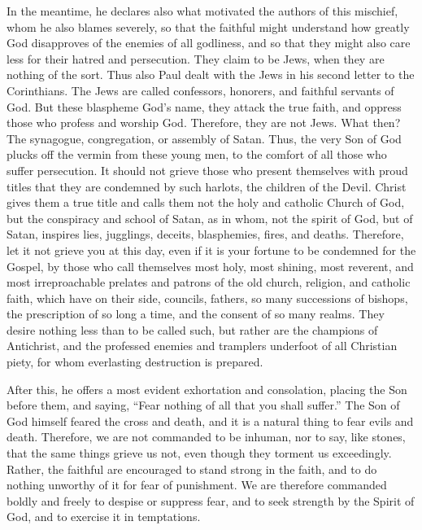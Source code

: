 In the meantime, he declares also what motivated the authors of this mischief, whom he also blames severely, so that the faithful might understand how greatly God disapproves of the enemies of all godliness, and so that they might also care less for their hatred and persecution. They claim to be Jews, when they are nothing of the sort. Thus also Paul dealt with the Jews in his second letter to the Corinthians. The Jews are called confessors, honorers, and faithful servants of God. But these blaspheme God’s name, they attack the true faith, and oppress those who profess and worship God. Therefore, they are not Jews. What then? The synagogue, congregation, or assembly of Satan. Thus, the very Son of God plucks off the vermin from these young men, to the comfort of all those who suffer persecution. It should not grieve those who present themselves with proud titles that they are condemned by such harlots, the children of the Devil. Christ gives them a true title and calls them not the holy and catholic Church of God, but the conspiracy and school of Satan, as in whom, not the spirit of God, but of Satan, inspires lies, jugglings, deceits, blasphemies, fires, and deaths. Therefore, let it not grieve you at this day, even if it is your fortune to be condemned for the Gospel, by those who call themselves most holy, most shining, most reverent, and most irreproachable prelates and patrons of the old church, religion, and catholic faith, which have on their side, councils, fathers, so many successions of bishops, the prescription of so long a time, and the consent of so many realms. They desire nothing less than to be called such, but rather are the champions of Antichrist, and the professed enemies and tramplers underfoot of all Christian piety, for whom everlasting destruction is prepared.

After this, he offers a most evident exhortation and consolation, placing the Son before them, and saying, “Fear nothing of all that you shall suffer.” The Son of God himself feared the cross and death, and it is a natural thing to fear evils and death. Therefore, we are not commanded to be inhuman, nor to say, like stones, that the same things grieve us not, even though they torment us exceedingly. Rather, the faithful are encouraged to stand strong in the faith, and to do nothing unworthy of it for fear of punishment. We are therefore commanded boldly and freely to despise or suppress fear, and to seek strength by the Spirit of God, and to exercise it in temptations.


